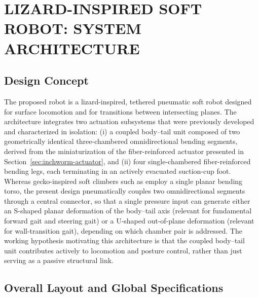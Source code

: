 

\section{LIZARD-INSPIRED SOFT ROBOT: SYSTEM ARCHITECTURE}
\label{sec:lizard-architecture}

\subsection{Design Concept}

The proposed robot is a lizard-inspired, tethered pneumatic soft robot
designed for surface locomotion and for transitions between intersecting
planes. The architecture integrates two actuation subsystems that were
previously developed and characterized in isolation: (i) a coupled
body--tail unit composed of two geometrically identical three-chambered
omnidirectional bending segments, derived from the miniaturization of the
fiber-reinforced actuator presented in Section~\ref{sec:inchworm-actuator}, and
(ii) four single-chambered fiber-reinforced bending legs, each terminating
in an actively evacuated suction-cup foot. Whereas gecko-inspired soft
climbers such as \cite{Schiller2019GeckoInspired} employ a single planar
bending torso, the present design pneumatically couples two
omnidirectional segments through a central connector, so that a single
pressure input can generate either an S-shaped planar deformation of the
body--tail axis (relevant for fundamental forward gait and steering gait) or a U-shaped out-of-plane deformation
(relevant for wall-transition gait), depending on which chamber pair is addressed.
The working hypothesis motivating this architecture is that the coupled
body--tail unit contributes actively to locomotion and posture control,
rather than just serving as a passive structural link.

\subsection{Overall Layout and Global Specifications}

